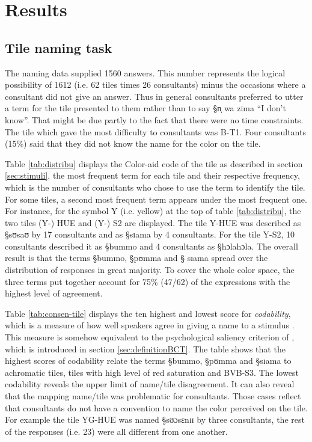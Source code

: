\section{Results}
\label{sec:COL-result}


\subsection{Tile naming task}
\label{sec:chiptask}


The naming data supplied 1560 answers. This number represents the logical
possibility of 1612 (i.e. 62 tiles times 26 consultants) minus the occasions
where
a consultant did not give an answer. Thus in general consultants preferred to
utter a
term for the tile presented to them rather than to say {\S n̩ wa zima} ``I don't
know''. That might be due partly to the fact that there were no time
constraints.  The tile which gave the most difficulty to  consultants was
B-T1.
Four consultants (15\%) said that they did not know the name for the color on
the
tile. 

Table \ref{tab:distribu} displays  the Color-aid code of the tile as described
in section \ref{sec:stimuli}, the  most frequent term for each tile and their
respective frequency, which is the number of consultants who chose to use the
term to identify the tile. For some tiles, a second most frequent term  appears
under the most
frequent one. For instance, for the  symbol Y (i.e. yellow) at the top of
table \ref{tab:distribu}, the two tiles (Y-) HUE and (Y-) S2 are displayed. The
tile  Y-HUE was described as {\S sʊsaʊ} by 17 consultants and as  {\S sɪama} by
4
consultants. For the tile Y-S2, 10 consultants described it as {\S bummo} and 4
consultants as {\S hɔlahɔla}. The overall result is that  the terms {\S bummo},
{\S pʊmma} and {\S
sɪama}  spread over the distribution of responses in great majority.   To cover
the whole color space, the three terms put together account for 75\% (47/62) of
the expressions with the highest level of agreement. 


Table \ref{tab:consen-tile} displays the ten highest and lowest score for
\textit{codability}, which is a measure of how well speakers
agree in giving a name to a stimulus \citep[351]{Lenn67}.  This measure is
somehow 
equivalent to the psychological saliency criterion of  \citet[6
(iv-(2))]{Berl69}, which is  introduced in section
\ref{sec:definitionBCT}. The table shows that the highest scores of codability
relate the terms
{\S bummo}, {\S pʊmma} and {\S sɪama} to achromatic tiles, tiles with high level
of red saturation and BVB-S3. The lowest codability reveals
the upper limit of name/tile disagreement. It can also reveal that the mapping
name/tile was problematic for  consultants. Those cases reflect that 
consultants do not have a convention to name the color perceived on the tile.
For
example the tile YG-HUE was named {\S sʊɔsɛnɪɪ} by three consultants, the rest
of
the responses (i.e. 23) were all different from one another.


